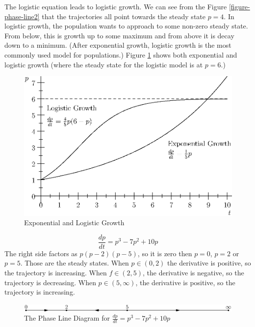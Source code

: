 \documentclass[fleqn]{report}
\begin{document}
The logistic equation leads to logistic growth. We can see
from the Figure \ref{figure-phase-line2} that the trajectories
all point towards the steady state $p=4$. In logistic growth,
the population wants to approach to some non-zero steady
state. From below, this is growth up to some maximum and from
above it is decay down to a minimum. (After exponential
growth, logistic growth is the most commonly used model for
populations.) Figure \ref{figure-exponential-growth}
shows both exponential and logistic growth (where the steady
state for the logistic model is at $p=6$.)

\begin{figure}[t]
\centering
\includegraphics[width=12cm]{figure44.eps}
\caption{Exponential and Logistic Growth}
\label{figure-exponential-growth}
\end{figure}

\begin{example}
\begin{equation*}
\frac{dp}{dt} = p^3 -7p^2 + 10p
\end{equation*}
The right side factors as $p(p-2)(p-5)$, so it is zero then
$p=0$, $p=2$ or $p=5$. Those are the
steady states. When $p \in (0,2)$ the derivative is positive,
so the trajectory is increasing. When $f \in (2,5)$, the
derivative is negative, so the trajectory is decreasing. When
$p \in (5,\infty)$, the derivative is positive, so the
trajectory is increasing. 
\end{example}

\begin{figure}[ht]
\centering
\includegraphics[width=12cm]{figure42.eps}
\caption{The Phase Line Diagram for $\frac{dp}{dt} = p^3 -
7p^2 + 10p$}
\label{figure-phase-line3}
\end{figure}
\end{document}
